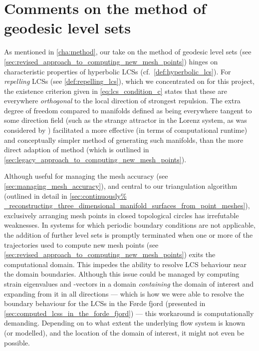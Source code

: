 \section{Comments on the method of geodesic level sets}
\label{sec:comments_on_the_method_of_geodesic_level_sets}
%
As mentioned in \cref{cha:method}, our take on the method of geodesic level
sets (see \cref{sec:revised_approach_to_computing_new_mesh_points}) hinges on
characteristic properties of hyperbolic LCSs (cf.\ \cref{def:hyperbolic_lcs}).
For \emph{repelling} LCSs (see \cref{def:repelling_lcs}), which we concentrated
on for this project, the existence criterion given in \cref{eq:lcs_condition_c}
states that these are everywhere \emph{orthogonal} to the local direction of
strongest repulsion. The extra degree of freedom compared to manifolds defined
as being everywhere tangent to some direction field (such as the strange
attractor in the Lorenz system, as was considered by
\textcite{krauskopf2005survey}) facilitated a more effective (in terms of
computational runtime) and conceptually simpler method of generating such
manifolds, than the more direct adaption of 
method (which is outlined in
\cref{sec:legacy_approach_to_computing_new_mesh_points}).

Although useful for managing the mesh accuracy (see
\cref{sec:managing_mesh_accuracy}), and central to our
triangulation algorithm (outlined in detail in \cref{sec:continuously%
_reconstructing_three_dimensional_manifold_surfaces_from_point_meshes}),
exclusively arranging mesh points in closed topological circles has irrefutable
weaknesses. In systems for which periodic boundary conditions are not
applicable, the addition of further level sets is promptly terminated when one
or more of the trajectories used to compute new mesh points (see
\cref{sec:revised_approach_to_computing_new_mesh_points}) exits the
computational domain. This impedes the ability to resolve LCS behaviour near
the domain boundaries. Although this issue could be managed by computing strain
eigenvalues and -vectors in a domain \emph{containing} the domain of interest
and expanding from it in all directions --- which is how we were able to
resolve the boundary behaviour for the LCSs in the Førde fjord (presented in
\cref{sec:computed_lcss_in_the_forde_fjord}) --- this workaround is
computationally demanding. Depending on to what extent the underlying flow
system is known (or modelled), and the location of the domain of interest, it
might not even be possible.

